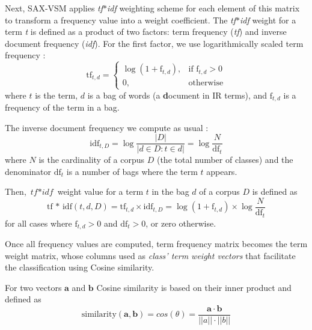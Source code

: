\documentclass[conference]{IEEEtran}
\begin{document}
Next, SAX-VSM applies \textit{tf$\ast$idf} weighting scheme for each element 
of this matrix to transform a frequency value into a weight coefficient. 
The \textit{tf$\ast$idf} weight for a term \textit{t} is defined as a 
product of two factors: term frequency (\textit{tf}) and inverse document 
frequency (\textit{idf}). 
For the first factor, we use logarithmically scaled term frequency \cite{logtf}:
\begin{equation}
 \mbox{tf}_{t, d} =  \begin{cases} \log(1 + \mbox{f}_{t,d}), &\mbox{if f}_{t,d}>0  \\
0, & \mbox{otherwise} \end{cases}
\end{equation} 
where $t$ is the term, $d$ is a bag of words (a \textbf{d}ocument in IR terms), 
and $\mbox{f}_{t,d}$ is a frequency of the term in a bag.

The inverse document frequency we compute as usual \cite{logtf}:
\begin{equation}
 \mbox{idf}_{t, D} =  \log\frac{|D|}{|d \in D : t \in d|} = \log\frac{N}{\mbox{df}_{t}}
 \label{formula:idf}
\end{equation} 
where $N$ is the cardinality of a corpus $D$ (the total number of classes) and the 
denominator $\mbox{df}_{t}$ is a number of bags where the term $t$ appears.

Then, $\textit{tf$\ast$idf}$ weight value for a term $t$ in the bag $d$ of a corpus $D$ 
is defined as 
\begin{equation}
 \mbox{tf * idf}(t, d, D) =  \mbox{tf}_{t, d} \times \mbox{idf}_{t, D} = \log(1 + \mbox{f}_{t,d})
\times \log\frac{N}{\mbox{df}_{t}}
 \label{formula:tfidf}
\end{equation} 
for all cases where $\mbox{f}_{t,d}>0$ and $\mbox{df}_{t}>0$, or zero otherwise.

Once all frequency values are computed, term frequency matrix becomes 
the term weight matrix, whose columns used as \textit{class' term weight vectors} 
that facilitate the classification using Cosine similarity.

For two vectors $\boldsymbol{a}$ and $\boldsymbol{b}$ Cosine similarity is based 
on their inner product and defined as
\begin{equation}
\mbox{similarity}(\boldsymbol{a},\boldsymbol{b}) = cos(\theta) = \frac{ 
\mathbf{a} \cdot \mathbf{b} } {\left| \left| a \right| \right| \cdot \left| \left| b \right|
\right|}
\end{equation} 
\end{document}
